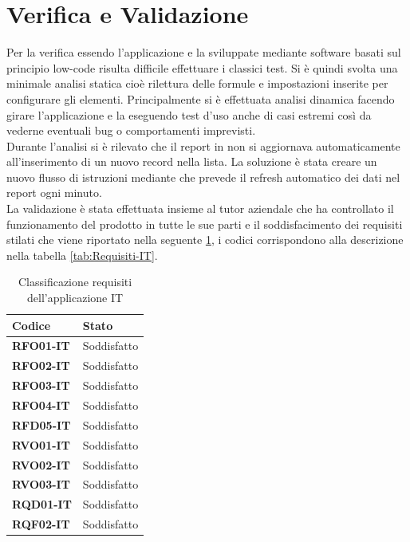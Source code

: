 \section{Verifica e Validazione}\label{sec:2App-Verifica}
Per la verifica essendo l'applicazione e la  sviluppate mediante software basati sul principio low-code risulta difficile effettuare i classici test.
Si è quindi svolta una minimale analisi statica cioè rilettura delle formule e impostazioni inserite per configurare gli elementi.
Principalmente si è effettuata analisi dinamica facendo girare l'applicazione e la  eseguendo test d'uso anche di casi estremi così da vederne eventuali bug o comportamenti imprevisti.\\
Durante l'analisi si è rilevato che il report in  non si aggiornava automaticamente all'inserimento di un nuovo record nella lista. 
La soluzione è stata creare un nuovo flusso di istruzioni mediante  che prevede il refresh automatico dei dati nel report ogni minuto.\\
La validazione è stata effettuata insieme al tutor aziendale che ha controllato il funzionamento del prodotto in tutte le sue parti e il soddisfacimento dei requisiti stilati che viene riportato nella seguente \tablename \space \ref{tab:RequisitiSoddisfatti-IT}, i codici corrispondono alla descrizione nella tabella \ref{tab:Requisiti-IT}.
\renewcommand{\arraystretch}{1.5} %
\begin{table}[H]
\begin{center}
  \begin{tabular}{ |m{6em}|m{6em}| }
    \hline
    \textbf{Codice} & \textbf{Stato} \\
    \hline
    \textbf{RFO01-IT} & Soddisfatto \\
    \hline
    \textbf{RFO02-IT} & Soddisfatto \\
    \hline
    \textbf{RFO03-IT} & Soddisfatto \\
    \hline
    \textbf{RFO04-IT} & Soddisfatto \\
    \hline
    \textbf{RFD05-IT} & Soddisfatto \\
    \hline
    \textbf{RVO01-IT} & Soddisfatto \\
    \hline
    \textbf{RVO02-IT} & Soddisfatto \\
    \hline
    \textbf{RVO03-IT} & Soddisfatto \\
    \hline
    \textbf{RQD01-IT} & Soddisfatto \\
    \hline
    \textbf{RQF02-IT} & Soddisfatto \\
    \hline
  \end{tabular}
  \caption{Classificazione requisiti dell'applicazione IT}
  \label{tab:RequisitiSoddisfatti-IT}
\end{center}
\end{table}